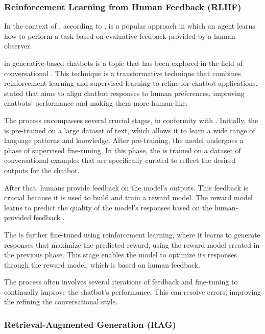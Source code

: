 \subsubsection{Reinforcement Learning from Human Feedback (RLHF)}

In the context of {\ai}, according to \citet{li_human-centered_2019}, {\rlhf} is a popular approach in which an agent learns how to perform a task based on evaluative feedback provided by a human observer.

{\rlhf} in generative-based chatbots is a topic that has been explored in the field of conversational {\ai}. This technique is a transformative technique that combines reinforcement learning and supervised learning to refine {\llm} for chatbot applications. \citet{tran_enhancing_2023} stated that {\rlhf} aims to align chatbot responses to human preferences, improving chatbots' performance and making them more human-like.

The process encompasses several crucial stages, in conformity with \citet{axelsson_modeling_2022}. Initially, the {\llm} is pre-trained on a large dataset of text, which allows it to learn a wide range of language patterns and knowledge. After pre-training, the model undergoes a phase of supervised fine-tuning. In this phase, the {\llm} is trained on a dataset of conversational examples that are specifically curated to reflect the desired outputs for the chatbot. 

After that, humans provide feedback on the model's outputs. This feedback is crucial because it is used to build and train a reward model. The reward model learns to predict the quality of the model's responses based on the human-provided feedback \cite{axelsson_modeling_2022}.

The {\llm} is further fine-tuned using reinforcement learning, where it learns to generate responses that maximize the predicted reward, using the reward model created in the previous phase. This stage enables the model to optimize its responses through the reward model, which is based on human feedback.

The process often involves several iterations of feedback and fine-tuning to continually improve the chatbot's performance. This can resolve errors, improving the refining the conversational style.



\subsubsection{Retrieval-Augmented Generation (RAG)}

